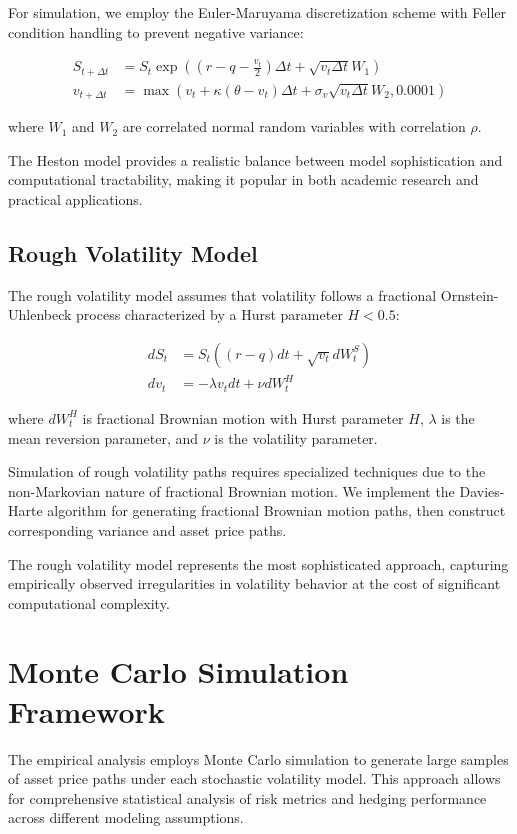 \documentclass[12pt,a4paper]{report}
\begin{document}
For simulation, we employ the Euler-Maruyama discretization scheme with Feller condition handling to prevent negative variance:

\begin{align}
S_{t+\Delta t} &= S_t \exp\left((r-q-\frac{v_t}{2})\Delta t + \sqrt{v_t \Delta t}W_1\right) \\
v_{t+\Delta t} &= \max\left(v_t + \kappa(\theta - v_t)\Delta t + \sigma_v\sqrt{v_t \Delta t}W_2, 0.0001\right)
\end{align}

where $W_1$ and $W_2$ are correlated normal random variables with correlation $\rho$.

The Heston model provides a realistic balance between model sophistication and computational tractability, making it popular in both academic research and practical applications.

\subsection{Rough Volatility Model}

The rough volatility model assumes that volatility follows a fractional Ornstein-Uhlenbeck process characterized by a Hurst parameter $H < 0.5$:

\begin{align}
dS_t &= S_t((r-q)dt + \sqrt{v_t}dW_t^S) \\
dv_t &= -\lambda v_t dt + \nu dW_t^H
\end{align}

where $dW_t^H$ is fractional Brownian motion with Hurst parameter $H$, $\lambda$ is the mean reversion parameter, and $\nu$ is the volatility parameter.

Simulation of rough volatility paths requires specialized techniques due to the non-Markovian nature of fractional Brownian motion. We implement the Davies-Harte algorithm for generating fractional Brownian motion paths, then construct corresponding variance and asset price paths.

The rough volatility model represents the most sophisticated approach, capturing empirically observed irregularities in volatility behavior at the cost of significant computational complexity.

\section{Monte Carlo Simulation Framework}

The empirical analysis employs Monte Carlo simulation to generate large samples of asset price paths under each stochastic volatility model. This approach allows for comprehensive statistical analysis of risk metrics and hedging performance across different modeling assumptions.
\end{document}
